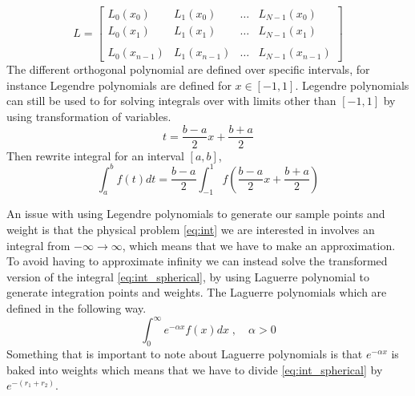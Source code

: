 \begin{equation}\label{eq:ort_matrix}
  L = \begin{bmatrix}
    L_0(x_0) & L_1(x_0) & \dots & L_{N-1}(x_{0}) \\
    L_0(x_1) & L_1(x_1) & \dots & L_{N-1}(x_{1}) \\
    \\
    L_0(x_{n-1}) & L_1(x_{n-1}) & \dots & L_{N-1}(x_{n-1}) 
  \end{bmatrix}
\end{equation}
The different orthogonal polynomial are defined over specific intervals, for
instance Legendre polynomials are defined for $x \in [-1, 1]$. Legendre
polynomials can still be used to for solving integrals over with limits other
than $[-1,1]$ by using transformation of variables. 
\begin{equation}
  t = \frac{b-a}{2}x + \frac{b+a}{2}
\end{equation} 
Then rewrite integral for an interval $[a,b]$,
\begin{equation}
  \int_a^b f(t)dt = \frac{b-a}{2}\int_{-1}^{1} f\left(\frac{b-a}{2}x + \frac{b+a}{2}\right)
\end{equation} 

An issue with using Legendre polynomials to generate our sample points and
weight is that the physical problem \cref{eq:int} we are interested in involves an
integral from $-\infty \to \infty$, which means that we have to make an
approximation. To avoid having to approximate infinity we can instead solve the
transformed version of the integral \cref{eq:int_spherical}, by using Laguerre
polynomial to generate integration points and weights. The Laguerre polynomials
which are defined in the following way.
\begin{equation}\label{eq:laguerre}
  \int_0^{\infty} e^{-\alpha x} f(x)dx \; , \quad \alpha > 0
\end{equation}
Something that is important to note about Laguerre polynomials is that
$e^{-\alpha x}$ is baked into weights which means that we have to divide
\cref{eq:int_spherical} by $e^{-(r_1 + r_2)}$. 

